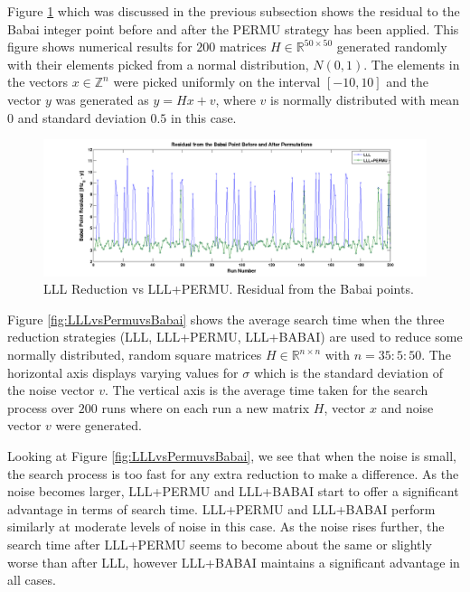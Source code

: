 \documentclass[12pt,Bold,letterpaper]{mcgilletdclass}
\begin{document}
Figure \ref{fig:LLLvsPermuBabai} which was discussed in the previous subsection
shows the residual to the Babai integer point before and after the PERMU strategy has
been applied. This figure shows numerical results for $200$ matrices $H \in\mathbb{R}^{50
\times 50}$ generated randomly with their elements picked from a normal
distribution, $N(0,1)$. The elements in the vectors $x \in \mathbb{Z}^n$ were picked
uniformly on the interval $[-10,10]$ and the vector $y$ was generated as $y = Hx
+ v$, where $v$ is normally distributed with mean $0$ and standard deviation
$0.5$ in this case.

\begin{figure}
\centering
\includegraphics[scale=0.36]{lllvslllpermubabai.png}
\caption{LLL Reduction vs LLL+PERMU. Residual from the Babai points.}
\label{fig:LLLvsPermuBabai}
\end{figure}

Figure \ref{fig:LLLvsPermuvsBabai} shows the average search time when the three reduction strategies (LLL, LLL+PERMU, LLL+BABAI) are used to reduce some normally distributed, random square matrices $H \in \mathbb{R}^{n \times n}$ with $ n = 35:5:50$. The horizontal axis displays varying values for $\sigma$ which is the standard deviation of the noise vector $v$. The vertical axis is the average time taken for the search process over $200$ runs where on each run a new matrix $H$, vector $x$ and noise vector $v$ were generated.

Looking at Figure \ref{fig:LLLvsPermuvsBabai}, we see that when the noise is
small, the search process is too fast for any extra reduction to make a
difference. As the noise becomes larger, LLL+PERMU and LLL+BABAI start to offer a significant
advantage in terms of search time. LLL+PERMU and LLL+BABAI perform similarly at
moderate levels of noise in this case. As the noise rises further, the search time after LLL+PERMU seems to become about the same or slightly worse than after LLL, however LLL+BABAI maintains a significant
advantage in all cases.
\end{document}
